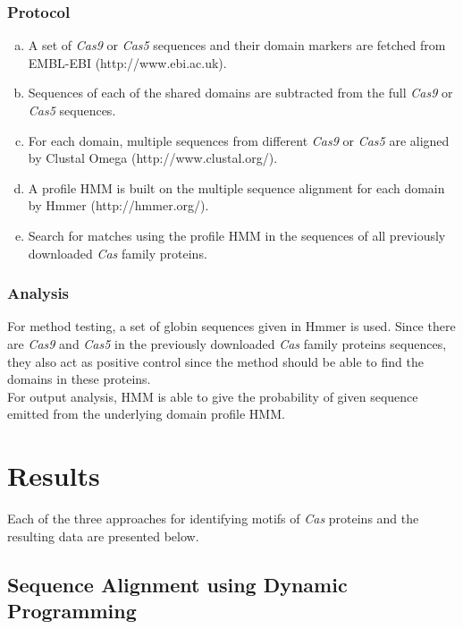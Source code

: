 \documentclass[11pt, oneside]{article}
\begin{document}
\subsubsection{Protocol}
\begin{enumerate}[a.]
\item A set of \textit{Cas9} or \textit{Cas5} sequences and their domain markers are fetched from EMBL-EBI (http://www.ebi.ac.uk).
\item Sequences of each of the shared domains are subtracted from the full \textit{Cas9} or \textit{Cas5} sequences.
\item For each domain, multiple sequences from different \textit{Cas9} or \textit{Cas5} are aligned by Clustal Omega (http://www.clustal.org/).
\item  A profile HMM is built on the multiple sequence alignment for each domain by Hmmer (http://hmmer.org/)\cite{hmmer}.
\item Search for matches using the profile HMM in the sequences of all previously downloaded \textit{Cas} family proteins.
\end{enumerate}


\subsubsection{Analysis}
For method testing, a set of globin sequences given in Hmmer\cite{hmmer} is used. Since there are \textit{Cas9} and \textit{Cas5} in the previously downloaded \textit{Cas} family proteins sequences, they also act as positive control since the method should be able to find the domains in these proteins.\\
For output analysis, HMM is able to give the probability of given sequence emitted from the underlying domain profile HMM.





\section{Results}

Each of the three approaches for identifying motifs of \textit{Cas} proteins and the resulting data are presented below. 


\subsection{Sequence Alignment using Dynamic Programming}
\end{document}
